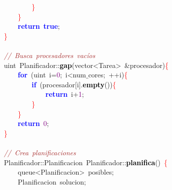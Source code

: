 \mbox{}\ \ \ \ \ \ \ \ \textcolor{Red}{\}} \\
\mbox{}\ \ \ \ \textcolor{Red}{\}} \\
\mbox{}\ \ \ \ \textbf{\textcolor{Blue}{return}}\ \textbf{\textcolor{Blue}{true}}\textcolor{BrickRed}{;} \\
\mbox{}\textcolor{Red}{\}} \\
\mbox{} \\
\mbox{}\textit{\textcolor{Brown}{//\ Busca\ procesadores\ vacíos}} \\
\mbox{}\textcolor{TealBlue}{uint}\ Planificador\textcolor{BrickRed}{::}\textbf{\textcolor{Black}{gap}}\textcolor{BrickRed}{(}\textcolor{TealBlue}{vector\textless{}Tarea\textgreater{}}\ \textcolor{BrickRed}{\&}procesador\textcolor{BrickRed}{)}\textcolor{Red}{\{} \\
\mbox{}\ \ \ \ \textbf{\textcolor{Blue}{for}}\ \textcolor{BrickRed}{(}\textcolor{TealBlue}{uint}\ i\textcolor{BrickRed}{=}\textcolor{Purple}{0}\textcolor{BrickRed}{;}\ i\textcolor{BrickRed}{\textless{}}num$\_$cores\textcolor{BrickRed}{;}\ \textcolor{BrickRed}{++}i\textcolor{BrickRed}{)}\textcolor{Red}{\{} \\
\mbox{}\ \ \ \ \ \ \ \ \textbf{\textcolor{Blue}{if}}\ \textcolor{BrickRed}{(}procesador\textcolor{BrickRed}{[}i\textcolor{BrickRed}{].}\textbf{\textcolor{Black}{empty}}\textcolor{BrickRed}{())}\textcolor{Red}{\{} \\
\mbox{}\ \ \ \ \ \ \ \ \ \ \ \ \textbf{\textcolor{Blue}{return}}\ i\textcolor{BrickRed}{+}\textcolor{Purple}{1}\textcolor{BrickRed}{;} \\
\mbox{}\ \ \ \ \ \ \ \ \textcolor{Red}{\}} \\
\mbox{}\ \ \ \ \textcolor{Red}{\}} \\
\mbox{}\ \ \ \ \textbf{\textcolor{Blue}{return}}\ \textcolor{Purple}{0}\textcolor{BrickRed}{;} \\
\mbox{}\textcolor{Red}{\}} \\
\mbox{} \\
\mbox{}\textit{\textcolor{Brown}{//\ Crea\ planificaciones}} \\
\mbox{}Planificador\textcolor{BrickRed}{::}\textcolor{TealBlue}{Planificacion}\ Planificador\textcolor{BrickRed}{::}\textbf{\textcolor{Black}{planifica}}\textcolor{BrickRed}{()}\ \textcolor{Red}{\{} \\
\mbox{}\ \ \ \ \textcolor{TealBlue}{queue\textless{}Planificacion\textgreater{}}\ posibles\textcolor{BrickRed}{;} \\
\mbox{}\ \ \ \ \textcolor{TealBlue}{Planificacion}\ solucion\textcolor{BrickRed}{;} \\
